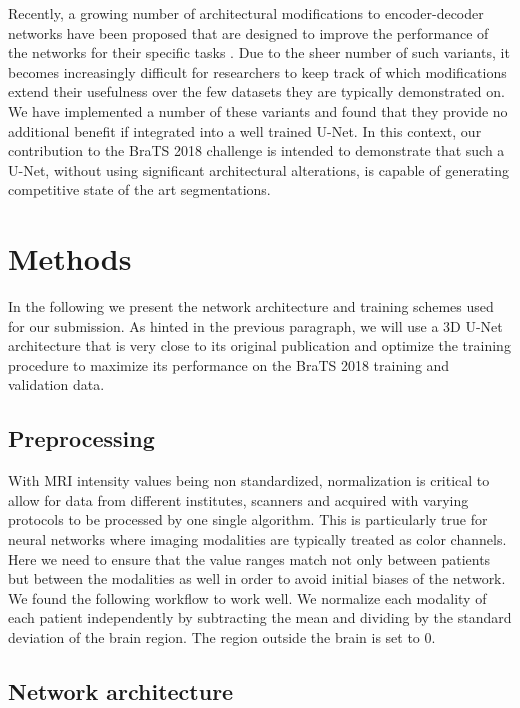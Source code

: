\documentclass{templates/llncs} %
\begin{document}
	Recently, a growing number of architectural modifications to encoder-decoder networks have been proposed that are designed to improve the performance of the networks for their specific tasks \cite{milletari2016v,jegou2017one,oktay2018attention,roy2018concurrent,wang2017automatic,isensee2017brain,kayalibay2017cnn,li2017h}. Due to the sheer number of such variants, it becomes increasingly difficult for researchers to keep track of which modifications extend their usefulness over the few datasets they are typically demonstrated on. We have implemented a number of these variants and found that they provide no additional benefit if integrated into a well trained U-Net. In this context, our contribution to the BraTS 2018 challenge is intended to demonstrate that such a U-Net, without using significant architectural alterations, is capable of generating competitive state of the art segmentations.

	\section{Methods}
	In the following we present the network architecture and training schemes used for our submission. As hinted in the previous paragraph, we will use a 3D U-Net architecture that is very close to its original publication \cite{cciccek20163d} and optimize the training procedure to maximize its performance on the BraTS 2018 training and validation data.
	
	\label{methods}	

	\subsection{Preprocessing}
	With MRI intensity values being non standardized, normalization is critical to allow for data from different institutes, scanners and acquired with varying protocols to be processed by one single algorithm. This is particularly true for neural networks where imaging modalities are typically treated as color channels. Here we need to ensure that the value ranges match not only between patients but between the modalities as well in order to avoid initial biases of the network. We found the following workflow to work well. We normalize each modality of each patient independently by subtracting the mean and dividing by the standard deviation of the brain region. The region outside the brain is set to 0.
	
	\subsection{Network architecture} 
\end{document}
